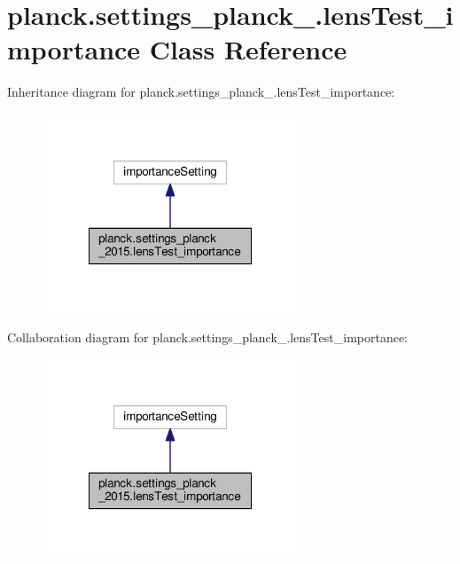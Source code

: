\hypertarget{classplanck_1_1settings__planck__2015_1_1lensTest__importance}{}\section{planck.\+settings\+\_\+planck\+\_.\+lens\+Test\+\_\+importance Class Reference}
\label{classplanck_1_1settings__planck__2015_1_1lensTest__importance}


Inheritance diagram for planck.\+settings\+\_\+planck\+\_.\+lens\+Test\+\_\+importance\+:
\nopagebreak
\begin{figure}[H]
\begin{center}
\leavevmode
\includegraphics[width=216pt]{classplanck_1_1settings__planck__2015_1_1lensTest__importance__inherit__graph}
\end{center}
\end{figure}


Collaboration diagram for planck.\+settings\+\_\+planck\+\_.\+lens\+Test\+\_\+importance\+:
\nopagebreak
\begin{figure}[H]
\begin{center}
\leavevmode
\includegraphics[width=216pt]{classplanck_1_1settings__planck__2015_1_1lensTest__importance__coll__graph}
\end{center}
\end{figure}
